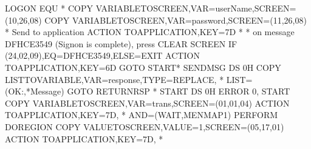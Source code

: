 \documentclass[letterpaper,10pt,english]{sphinxmanual}
\begin{document}
\begin{sphinxVerbatim}[commandchars=\\\{\}]
LOGON    EQU   *
         COPY\PYGZdl{} VARIABLE\PYGZhy{}TO\PYGZhy{}SCREEN,VAR=\PYGZsq{}userName\PYGZsq{},SCREEN=(10,26,08)
         COPY\PYGZdl{} VARIABLE\PYGZhy{}TO\PYGZhy{}SCREEN,VAR=\PYGZsq{}password\PYGZsq{},SCREEN=(11,26,08)
*    Send to application
         ACTION\PYGZdl{}  TO\PYGZhy{}APPLICATION,KEY=7D
*
*    on message DFHCE3549 (Signon is complete), press CLEAR SCREEN
         IF\PYGZdl{}   (24,02,09),EQ=\PYGZsq{}DFHCE3549\PYGZsq{},ELSE=EXIT
         ACTION\PYGZdl{}  TO\PYGZhy{}APPLICATION,KEY=6D
         GOTO\PYGZdl{} START*\PYGZus{}\PYGZus{}\PYGZus{}\PYGZus{}\PYGZus{}\PYGZus{}\PYGZus{}\PYGZus{}\PYGZus{}\PYGZus{}\PYGZus{}\PYGZus{}\PYGZus{}\PYGZus{}\PYGZus{}\PYGZus{}\PYGZus{}\PYGZus{}\PYGZus{}\PYGZus{}\PYGZus{}\PYGZus{}\PYGZus{}\PYGZus{}\PYGZus{}\PYGZus{}\PYGZus{}\PYGZus{}\PYGZus{}\PYGZus{}\PYGZus{}\PYGZus{}\PYGZus{}\PYGZus{}\PYGZus{}\PYGZus{}\PYGZus{}\PYGZus{}\PYGZus{}\PYGZus{}\PYGZus{}\PYGZus{}\PYGZus{}\PYGZus{}\PYGZus{}\PYGZus{}\PYGZus{}\PYGZus{}\PYGZus{}\PYGZus{}\PYGZus{}\PYGZus{}\PYGZus{}\PYGZus{}\PYGZus{}\PYGZus{}\PYGZus{}\PYGZus{}\PYGZus{}\PYGZus{}\PYGZus{}\PYGZus{}\PYGZus{}\PYGZus{}\PYGZus{}\PYGZus{}\PYGZus{}\PYGZus{}\PYGZus{}\PYGZus{}
SENDMSG  DS   0H
         COPY\PYGZdl{} LIST\PYGZhy{}TO\PYGZhy{}VARIABLE,VAR=\PYGZsq{}response\PYGZsq{},TYPE=REPLACE,           *
               LIST=(\PYGZsq{}OK:\PYGZsq{},\PYGZsq{}*Message\PYGZsq{})
         GOTO\PYGZdl{} RETURN\PYGZus{}RSP
*\PYGZus{}\PYGZus{}\PYGZus{}\PYGZus{}\PYGZus{}\PYGZus{}\PYGZus{}\PYGZus{}\PYGZus{}\PYGZus{}\PYGZus{}\PYGZus{}\PYGZus{}\PYGZus{}\PYGZus{}\PYGZus{}\PYGZus{}\PYGZus{}\PYGZus{}\PYGZus{}\PYGZus{}\PYGZus{}\PYGZus{}\PYGZus{}\PYGZus{}\PYGZus{}\PYGZus{}\PYGZus{}\PYGZus{}\PYGZus{}\PYGZus{}\PYGZus{}\PYGZus{}\PYGZus{}\PYGZus{}\PYGZus{}\PYGZus{}\PYGZus{}\PYGZus{}\PYGZus{}\PYGZus{}\PYGZus{}\PYGZus{}\PYGZus{}\PYGZus{}\PYGZus{}\PYGZus{}\PYGZus{}\PYGZus{}\PYGZus{}\PYGZus{}\PYGZus{}\PYGZus{}\PYGZus{}\PYGZus{}\PYGZus{}\PYGZus{}\PYGZus{}\PYGZus{}\PYGZus{}\PYGZus{}\PYGZus{}\PYGZus{}\PYGZus{}\PYGZus{}\PYGZus{}\PYGZus{}\PYGZus{}\PYGZus{}\PYGZus{}
START    DS   0H
         ERROR\PYGZdl{} 0,\PYGZsq{}\PYGZhy{}\PYGZhy{}\PYGZhy{} START\PYGZsq{}
         COPY\PYGZdl{} VARIABLE\PYGZhy{}TO\PYGZhy{}SCREEN,VAR=\PYGZsq{}trans\PYGZsq{},SCREEN=(01,01,04)
               ACTION\PYGZdl{}  TO\PYGZhy{}APPLICATION,KEY=7D,                         *
               AND=(WAIT,\PYGZsq{}MENMAP1\PYGZsq{})
         PERFORM\PYGZdl{} DOREGION
         COPY\PYGZdl{} VALUE\PYGZhy{}TO\PYGZhy{}SCREEN,VALUE=\PYGZsq{}1\PYGZsq{},SCREEN=(05,17,01)
         ACTION\PYGZdl{}  TO\PYGZhy{}APPLICATION,KEY=7D,                               *

\end{sphinxVerbatim}
\end{document}
